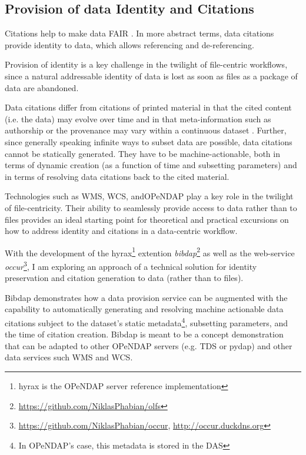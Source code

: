 \documentclass[a4paper,10pt]{article}
\begin{document}
\newpage

\subsection{Provision of data Identity and Citations}
Citations help to make data \acrfull{FAIR} \citep{Wilkinson2016}. In more abstract terms, data citations provide identity to data, which allows referencing and de-referencing.

Provision of identity is a key challenge in the twilight of file-centric workflows, since a natural addressable identity of data is lost as soon as files as a package of data are abandoned.

Data citations differ from citations of printed material in that the cited content (i.e. the data) may evolve over time and in that meta-information such as authorship or the provenance may vary within a continuous dataset \citep{Buneman2016}. Further, since generally speaking infinite ways to subset data are possible, data citations cannot be statically generated. They have to be machine-actionable, both in terms of dynamic creation (as a function of time and subsetting parameters) and in terms of resolving data citations back to the cited material.

Technologies such as \gls{WMS}, \gls{WCS}, and\gls{OPeNDAP} \citep{Gallagher2005} play a key role in the twilight of file-centricity. Their ability to seamlessly provide access to data rather than to files provides an ideal starting point for theoretical and practical excursions on how to address identity and citations in a data-centric workflow. 

With the development of the hyrax\footnote{hyrax is the \gls{OPeNDAP} server reference implementation} extention \textit{bibdap}\footnote{\url{https://github.com/NiklasPhabian/olfs}} as well as the web-service \textit{occur}\footnote{\url{https://github.com/NiklasPhabian/occur}, \url{http://occur.duckdns.org}}, I am exploring an approach of a technical solution for identity preservation and citation generation to data (rather than to files).

Bibdap demonstrates how a data provision service can be augmented with the capability to automatically generating and resolving machine actionable data citations subject to the dataset's static metadata\footnote{In \gls{OPeNDAP}'s case, this metadata is stored in the \gls{DAS}}, subsetting parameters, and the time of citation creation. Bibdap is meant to be a concept demonstration that can be adapted to other \gls{OPeNDAP} servers (e.g. \gls{TDS} or pydap) and other data services such \gls{WMS} and \gls{WCS}.
\end{document}
